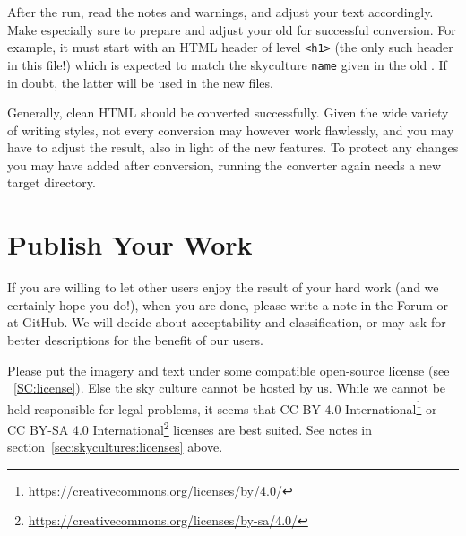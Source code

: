 \noindent After the run, read the notes and warnings, and adjust your text accordingly. 
Make especially sure to prepare and adjust your old  for successful conversion.
For example, it must start with an HTML header of level \texttt{<h1>} (the only such header in this file!) which is expected 
to match the skyculture \texttt{name} given in the old . If in doubt, the latter will be used in the new files.

Generally, clean HTML should be converted successfully. 
Given the wide variety of writing styles, not every conversion may however work flawlessly, 
and you may have to adjust the result, also in light of the new features. 
To protect any changes you may have added after conversion, running the converter again needs a new target directory. 


\section{Publish Your Work}
\label{sec:skyculture:publish}

If you are willing to let other users enjoy the result of your hard
work (and we certainly hope you do!), when you are done, please write
a note in the Forum or at GitHub. We will decide about acceptability
and classification, or may ask for better descriptions for the
benefit of our users.

Please put the imagery and text
under some compatible open-source license (see ~\ref{SC:license}).
Else the sky culture cannot be hosted by us.
While we cannot be held responsible for legal problems, it seems that
CC BY 4.0 International\footnote{\url{https://creativecommons.org/licenses/by/4.0/}} or
CC BY-SA 4.0 International\footnote{\url{https://creativecommons.org/licenses/by-sa/4.0/}}
licenses are best suited. See notes in section~\ref{sec:skycultures:licenses} above. 



